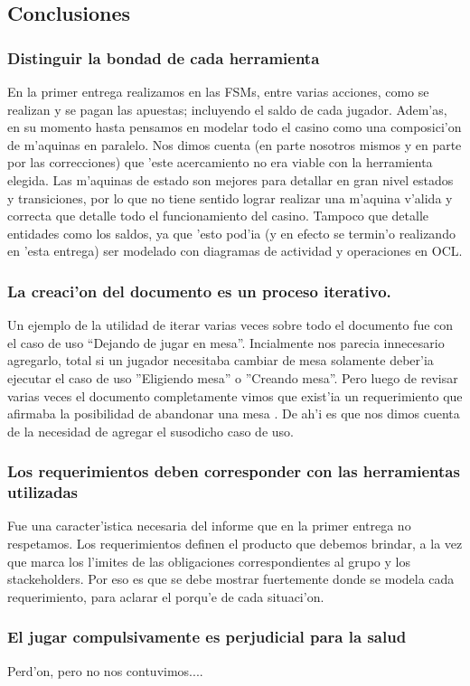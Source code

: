 \subsection{Conclusiones}

\subsubsection{Distinguir la bondad de cada herramienta}
En la primer entrega realizamos en las FSMs, entre varias acciones, como se realizan y se pagan las apuestas; incluyendo el saldo de cada jugador. Adem'as, en su momento hasta pensamos en modelar todo el casino como una composici'on de m'aquinas en paralelo. Nos dimos cuenta (en parte nosotros mismos y en parte por las correcciones) que 'este acercamiento no era viable con la herramienta elegida. Las m'aquinas de estado son mejores para detallar en gran nivel estados y transiciones, por lo que no tiene sentido lograr realizar una m'aquina v'alida y correcta que detalle todo el funcionamiento del casino. Tampoco que detalle entidades como los saldos, ya que 'esto pod'ia (y en efecto se termin'o realizando en 'esta entrega) ser modelado con diagramas de actividad y operaciones en OCL.

\subsubsection{La creaci'on del documento es un proceso iterativo.}
Un ejemplo de la utilidad de iterar varias veces sobre todo el documento fue con el caso de uso ``Dejando de jugar en mesa''. Incialmente nos parecia innecesario agregarlo, total si un jugador necesitaba cambiar de mesa solamente deber'ia ejecutar el caso de uso ''Eligiendo mesa'' o ''Creando mesa''. Pero luego de revisar varias veces el documento completamente vimos que exist'ia un requerimiento que afirmaba la posibilidad de abandonar una mesa . De ah'i es que nos dimos cuenta de la necesidad de agregar el susodicho caso de uso.

\subsubsection{Los requerimientos deben corresponder con las herramientas utilizadas}
Fue una caracter'istica necesaria del informe que en la primer entrega no respetamos. Los requerimientos definen el producto que debemos brindar, a la vez que marca los l'imites de las obligaciones correspondientes al grupo y los stackeholders. Por eso es que se debe mostrar fuertemente donde se modela cada requerimiento, para aclarar el porqu'e de cada situaci'on.

\subsubsection{El jugar compulsivamente es perjudicial para la salud}
Perd'on, pero no nos contuvimos....
